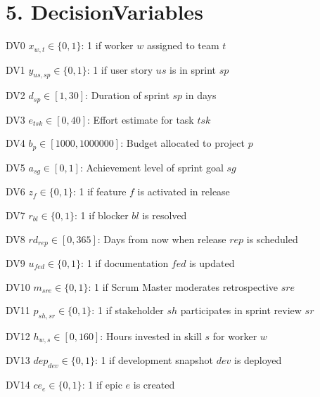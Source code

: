 \documentclass[12pt]{article}
\begin{document}
\section{5. DecisionVariables}
\item[DV0] $x_{w,t} \in \{0,1\}$: 1 if worker $w$ assigned to team $t$
    \item[DV1] $y_{us,sp} \in \{0,1\}$: 1 if user story $us$ is in sprint $sp$
    \item[DV2] $d_{sp} \in [1,30]$: Duration of sprint $sp$ in days
    \item[DV3] $e_{tsk} \in [0,40]$: Effort estimate for task $tsk$
    \item[DV4] $b_p \in [1000,1000000]$: Budget allocated to project $p$
    \item[DV5] $a_{sg} \in [0,1]$: Achievement level of sprint goal $sg$
    \item[DV6] $z_f \in \{0,1\}$: 1 if feature $f$ is activated in release
    \item[DV7] $r_{bl} \in \{0,1\}$: 1 if blocker $bl$ is resolved
    \item[DV8] $rd_{rep} \in [0,365]$: Days from now when release $rep$ is scheduled
    \item[DV9] $u_{fed} \in \{0,1\}$: 1 if documentation $fed$ is updated
    \item[DV10] $m_{sre} \in \{0,1\}$: 1 if Scrum Master moderates retrospective $sre$
    \item[DV11] $p_{sh,sr} \in \{0,1\}$: 1 if stakeholder $sh$ participates in sprint review $sr$
    \item[DV12] $h_{w,s} \in [0,160]$: Hours invested in skill $s$ for worker $w$
    \item[DV13] $dep_{dev} \in \{0,1\}$: 1 if development snapshot $dev$ is deployed
    \item[DV14] $ce_e \in \{0,1\}$: 1 if epic $e$ is created
\end{document}
